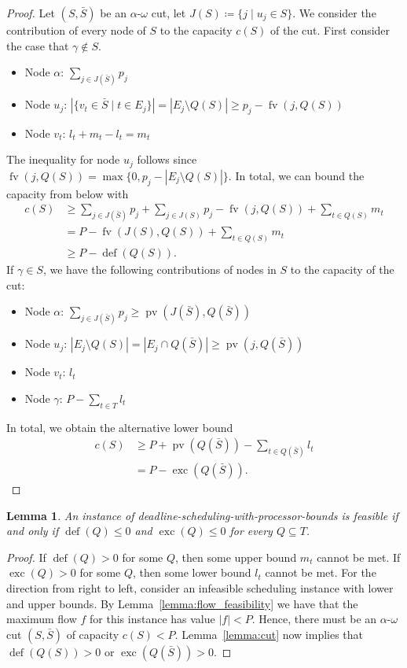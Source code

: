 \documentclass[a4paper]{article}
\DeclareMathOperator{\fv}{fv}
\DeclareMathOperator{\pv}{pv}
\DeclareMathOperator{\opdef}{def}
\DeclareMathOperator{\exc}{exc}
\newtheorem{lemma}[theorem]{Lemma}
\begin{document}
\begin{proof}
  Let $(S, \bar S)$ be an $\alpha$-$\omega$ cut, let $J(S) \coloneqq \{j \mid u_j \in S\}$.
  We consider the contribution of every node of $S$ to the capacity $c(S)$ of the cut.
  First consider the case that $\gamma \notin S$.
  \begin{itemize}
    \item Node $\alpha$: $\sum_{j \in J(\bar S)} p_j$
    \item Node $u_j$: $|\{v_t \in \bar S \mid t \in E_j\}| = | E_j \setminus Q(S) | \geq p_j - \fv(j, Q(S))$
    \item Node $v_t$: $l_t + m_t - l_t = m_t$
  \end{itemize}
  The inequality for node $u_j$ follows since $\fv(j, Q(S)) = \max \{0, p_j - |E_j \setminus Q(S)| \}$.
  In total, we can bound the capacity from below with
  \begin{align}
    c(S) &\geq \sum_{j \in J(\bar S)} p_j + \sum_{j \in J(S)} p_j - \fv(j, Q(S)) + \sum_{t \in Q(S)} m_t
    \\ &= P - \fv(J(S), Q(S)) + \sum_{t \in Q(S)} m_t
    \\ &\geq P - \opdef(Q(S))\text{.}
  \end{align}
  If $\gamma \in S$, we have the following contributions of nodes in $S$ to the capacity of the cut:
  \begin{itemize}
    \item Node $\alpha$: $\sum_{j \in J(\bar S)} p_j \geq \pv(J(\bar S), Q(\bar S))$
    \item Node $u_j$: $| E_j \setminus Q(S) |
      = | E_j \cap Q(\bar S)| \geq \pv(j, Q(\bar S))$
    \item Node $v_t$: $l_t$
    \item Node $\gamma$: $P - \sum_{t \in T} l_t$
  \end{itemize}
  In total, we obtain the alternative lower bound
  \begin{align}
    c(S) &\geq P + \pv(Q(\bar S))
    - \sum_{t \in Q(\bar S)} l_t
    \\ &= P - \exc(Q(\bar S)) \text{.}
  \end{align}

\end{proof}

\begin{lemma}\label{lemma:feasibility}
  An instance of deadline-scheduling-with-processor-bounds is feasible if and only if $\opdef(Q) \leq 0$ and $\exc(Q) \leq 0$ for every $Q \subseteq T$.
\end{lemma}
\begin{proof}
  If $\opdef(Q) > 0$ for some $Q$, then some upper bound $m_t$ cannot be met.
  If $\exc(Q) > 0$ for some $Q$, then some lower bound $l_t$ cannot be met.
  For the direction from right to left, consider an infeasible scheduling instance with lower and upper bounds.
  By Lemma~\ref{lemma:flow_feasibility} we have that the maximum flow $f$ for this instance has value $|f| < P$.
  Hence, there must be an $\alpha$-$\omega$ cut $(S, \bar S)$ of capacity $c(S) < P$.
  Lemma~\ref{lemma:cut} now implies that $\opdef(Q(S)) > 0$ or $\exc(Q(\bar S)) > 0$.
\end{proof}
\end{document}
